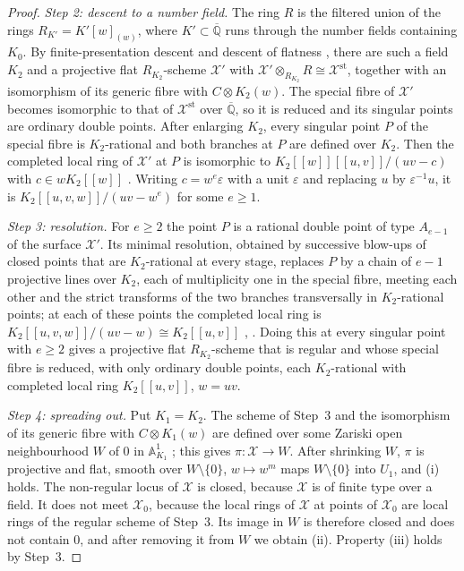 \documentclass[11pt]{amsart}
\theoremstyle{definition}
\theoremstyle{remark}
\numberwithin{equation}{section}
\newcommand{\Qb}{\overline{\mathbb{Q}}}
\newcommand{\A}{\mathbb{A}}
\newcommand{\cX}{\mathcal{X}}
\begin{document}
\begin{proof}
\emph{Step 2: descent to a number field.} The ring $R$ is the filtered union of the rings $R_{K'}=K'[w]_{(w)}$, where $K'\subset\Qb$ runs through the number fields containing $K_0$. By finite-presentation descent and descent of flatness \citep[Tags 01ZM, 04AI]{StacksProject}, there are such a field $K_2$ and a projective flat $R_{K_2}$-scheme $\cX'$ with $\cX'\otimes_{R_{K_2}}R\cong\cX^{\mathrm{st}}$, together with an isomorphism of its generic fibre with $C\otimes K_2(w)$. The special fibre of $\cX'$ becomes isomorphic to that of $\cX^{\mathrm{st}}$ over $\Qb$, so it is reduced and its singular points are ordinary double points. After enlarging $K_2$, every singular point $P$ of the special fibre is $K_2$-rational and both branches at $P$ are defined over $K_2$. Then the completed local ring of $\cX'$ at $P$ is isomorphic to $K_2[[w]][[u,v]]/(uv-c)$ with $c\in wK_2[[w]]$ \citep[\S1, especially pp.~84--85]{DeligneMumford1969}. Writing $c=w^e\varepsilon$ with a unit $\varepsilon$ and replacing $u$ by $\varepsilon^{-1}u$, it is $K_2[[u,v,w]]/(uv-w^e)$ for some $e\ge1$.

\emph{Step 3: resolution.} For $e\ge2$ the point $P$ is a rational double point of type $A_{e-1}$ of the surface $\cX'$. Its minimal resolution, obtained by successive blow-ups of closed points that are $K_2$-rational at every stage, replaces $P$ by a chain of $e-1$ projective lines over $K_2$, each of multiplicity one in the special fibre, meeting each other and the strict transforms of the two branches transversally in $K_2$-rational points; at each of these points the completed local ring is $K_2[[u,v,w]]/(uv-w)\cong K_2[[u,v]]$ \citep[\S1]{DeligneMumford1969}, \citep[\S1, especially pp.~84--85]{DeligneMumford1969}. Doing this at every singular point with $e\ge2$ gives a projective flat $R_{K_2}$-scheme that is regular and whose special fibre is reduced, with only ordinary double points, each $K_2$-rational with completed local ring $K_2[[u,v]]$, $w=uv$.

\emph{Step 4: spreading out.} Put $K_1=K_2$. The scheme of Step~3 and the isomorphism of its generic fibre with $C\otimes K_1(w)$ are defined over some Zariski open neighbourhood $W$ of $0$ in $\A^1_{K_1}$ \citep[Tag 01ZM]{StacksProject}; this gives $\pi:\cX\to W$. After shrinking $W$, $\pi$ is projective and flat, smooth over $W\setminus\{0\}$, $w\mapsto w^m$ maps $W\setminus\{0\}$ into $U_1$, and (i) holds. The non-regular locus of $\cX$ is closed, because $\cX$ is of finite type over a field. It does not meet $\cX_0$, because the local rings of $\cX$ at points of $\cX_0$ are local rings of the regular scheme of Step~3. Its image in $W$ is therefore closed and does not contain $0$, and after removing it from $W$ we obtain (ii). Property (iii) holds by Step~3.
\end{proof}
\end{document}
